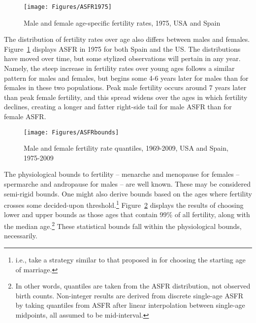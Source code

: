 \begin{figure}[ht!]
        \centering  
          \caption{Male and female age-specific fertility rates, 1975, USA and
          Spain}
           \texttt{[image: Figures/ASFR1975]}  
          \label{fig:ASFR1975}
\end{figure}

The distribution of fertility rates over age also differs between males and
females. Figure~\ref{fig:ASFR1975} displays ASFR in 1975 for both Spain and the
US. The distributions have moved over time, but some stylized observations will
pertain in any year. Namely, the steep increase in fertility rates over young
ages follows a similar pattern for males and females, but begins some 4-6 years
later for males than for females in these two populations. Peak male fertility
occurs around 7 years later than peak female fertility, and this spread widens
over the ages in which fertility declines, creating a longer and fatter
right-side tail for male ASFR than for female ASFR. 

\begin{figure}[ht!]
        \centering  
          \caption{Male and female fertility rate quantiles, 1969-2009, USA and
          Spain, 1975-2009}
           \texttt{[image: Figures/ASFRbounds]}
          \label{fig:TFRboundsseries}
\end{figure}

The physiological bounds to fertility -- menarche and menopause for
females -- spermarche and andropause for males -- are well known. These may be
considered semi-rigid bounds. One might also derive bounds based on the ages
where fertility crosses some decided-upon threshold.\footnote{i.e., take a
strategy similar to that proposed in \citet{coale1971age} for choosing the
starting age of marriage.} Figure~\ref{fig:TFRboundsseries} displays the
results of choosing lower and upper bounds as those ages that contain 99\% of
all fertility, along with the median age.\footnote{In other words, quantiles are
taken from the ASFR distribution, not observed birth counts. Non-integer results are derived from
discrete single-age ASFR by taking quantiles from ASFR after linear
interpolation between single-age midpoints, all assumed to be mid-interval.} 
These statistical bounds fall within the physiological bounds, necessarily. 

